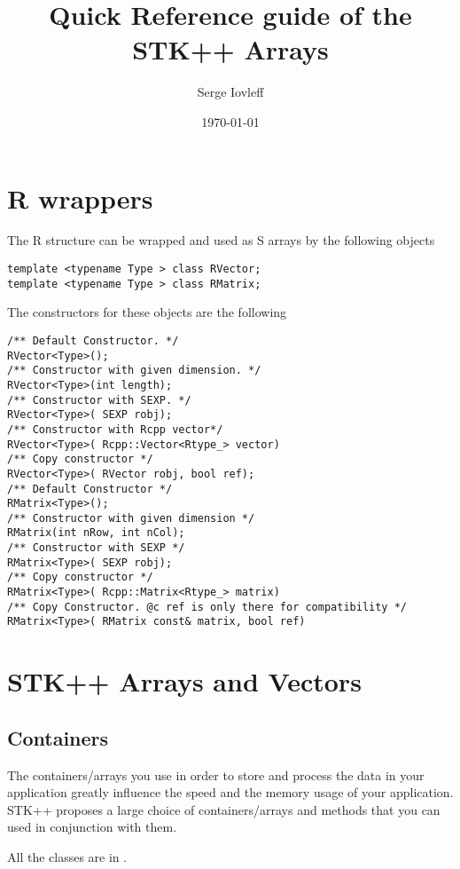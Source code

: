 \documentclass[a4paper,10pt]{article}
\title{ Quick Reference guide of the STK++ Arrays}
\author{Serge Iovleff}
\date{\today}
\begin{document}


\maketitle

\section{R wrappers}

The R structure  can be wrapped and used as S\stkpp{} arrays by the
following objects
\begin{lstlisting}[style=customcpp]
template <typename Type > class RVector;
template <typename Type > class RMatrix;
\end{lstlisting}

The constructors for these objects are the following
\begin{lstlisting}[style=customcpp]
/** Default Constructor. */
RVector<Type>();
/** Constructor with given dimension. */
RVector<Type>(int length);
/** Constructor with SEXP. */
RVector<Type>( SEXP robj);
/** Constructor with Rcpp vector*/
RVector<Type>( Rcpp::Vector<Rtype_> vector)
/** Copy constructor */
RVector<Type>( RVector robj, bool ref);
/** Default Constructor */
RMatrix<Type>();
/** Constructor with given dimension */
RMatrix(int nRow, int nCol);
/** Constructor with SEXP */
RMatrix<Type>( SEXP robj);
/** Copy constructor */
RMatrix<Type>( Rcpp::Matrix<Rtype_> matrix)
/** Copy Constructor. @c ref is only there for compatibility */
RMatrix<Type>( RMatrix const& matrix, bool ref)
\end{lstlisting}

\section{STK++ Arrays and Vectors}

\subsection{Containers}

The containers/arrays you use in order to store and process the data in your
application greatly influence the speed and the memory usage of your application.
STK++ proposes a large choice of containers/arrays and methods that you can used in
conjunction with them.

All the classes are in .
\end{document}
